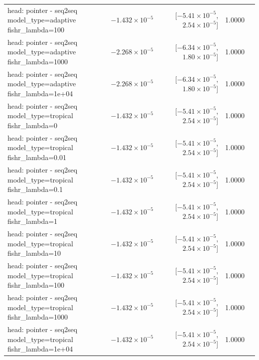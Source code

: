 \documentclass[10pt]{article}
\makeatletter
\newcommand{\stackcell}[1]{\begin{tabular}[t]{@{}l@{}}#1\end{tabular}}
\makeatother
\begin{document}
{\begin{longtable}{lrrrl}
\stackcell{head: pointer - seq2seq\\\footnotesize model\_type=adaptive fishr\_lambda=100 } & $-1.432\times10^{-5}$ & [$-5.41\times10^{-5}$, $2.54\times10^{-5}$] & 1.0000 & \\
\stackcell{head: pointer - seq2seq\\\footnotesize model\_type=adaptive fishr\_lambda=1000 } & $-2.268\times10^{-5}$ & [$-6.34\times10^{-5}$, $1.80\times10^{-5}$] & 1.0000 & \\
\stackcell{head: pointer - seq2seq\\\footnotesize model\_type=adaptive fishr\_lambda=1e+04 } & $-2.268\times10^{-5}$ & [$-6.34\times10^{-5}$, $1.80\times10^{-5}$] & 1.0000 & \\
\stackcell{head: pointer - seq2seq\\\footnotesize model\_type=tropical fishr\_lambda=0 } & $-1.432\times10^{-5}$ & [$-5.41\times10^{-5}$, $2.54\times10^{-5}$] & 1.0000 & \\
\stackcell{head: pointer - seq2seq\\\footnotesize model\_type=tropical fishr\_lambda=0.01 } & $-1.432\times10^{-5}$ & [$-5.41\times10^{-5}$, $2.54\times10^{-5}$] & 1.0000 & \\
\stackcell{head: pointer - seq2seq\\\footnotesize model\_type=tropical fishr\_lambda=0.1 } & $-1.432\times10^{-5}$ & [$-5.41\times10^{-5}$, $2.54\times10^{-5}$] & 1.0000 & \\
\stackcell{head: pointer - seq2seq\\\footnotesize model\_type=tropical fishr\_lambda=1 } & $-1.432\times10^{-5}$ & [$-5.41\times10^{-5}$, $2.54\times10^{-5}$] & 1.0000 & \\
\stackcell{head: pointer - seq2seq\\\footnotesize model\_type=tropical fishr\_lambda=10 } & $-1.432\times10^{-5}$ & [$-5.41\times10^{-5}$, $2.54\times10^{-5}$] & 1.0000 & \\
\stackcell{head: pointer - seq2seq\\\footnotesize model\_type=tropical fishr\_lambda=100 } & $-1.432\times10^{-5}$ & [$-5.41\times10^{-5}$, $2.54\times10^{-5}$] & 1.0000 & \\
\stackcell{head: pointer - seq2seq\\\footnotesize model\_type=tropical fishr\_lambda=1000 } & $-1.432\times10^{-5}$ & [$-5.41\times10^{-5}$, $2.54\times10^{-5}$] & 1.0000 & \\
\stackcell{head: pointer - seq2seq\\\footnotesize model\_type=tropical fishr\_lambda=1e+04 } & $-1.432\times10^{-5}$ & [$-5.41\times10^{-5}$, $2.54\times10^{-5}$] & 1.0000 & \\

\end{longtable}}
\end{document}
